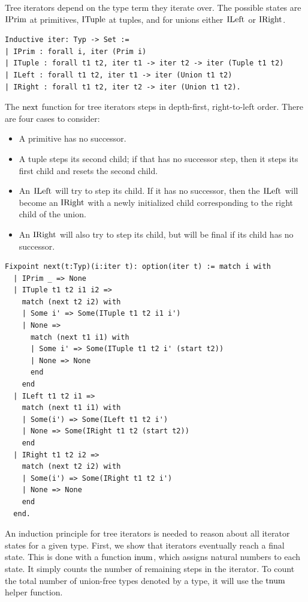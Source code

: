 \documentclass[a4paper,english]{lipics-v2019}
\renewcommand{\c}[1]{\ensuremath{\text{\lstinline{#1}}}\xspace}
\begin{document}
Tree iterators depend on the type term they iterate over. The possible
states are \c{IPrim} at primitives, \c{ITuple} at tuples, and for unions
either \c{ILeft} or \c{IRight}.

\begin{lstlisting}
Inductive iter: Typ -> Set :=
| IPrim : forall i, iter (Prim i)
| ITuple : forall t1 t2, iter t1 -> iter t2 -> iter (Tuple t1 t2)
| ILeft : forall t1 t2, iter t1 -> iter (Union t1 t2)
| IRight : forall t1 t2, iter t2 -> iter (Union t1 t2).
\end{lstlisting}

\noindent
The \c{next} function for tree iterators steps in depth-first,
right-to-left order. There are four cases to consider:
\begin{itemize}
  \item A primitive has no successor.
  \item A tuple steps its second child; if that
has no successor step, then it steps its first child and resets the second
child.
  \item An \c{ILeft} will try to step its child. If it has no successor, then the \c{ILeft} will become an \c{IRight} with a newly initialized child corresponding to the right child of the union.
  \item An \c{IRight} will also try to step its child, but will be final if its child has no successor.
  \end{itemize}

\begin{lstlisting}
Fixpoint next(t:Typ)(i:iter t): option(iter t) := match i with
  | IPrim _ => None
  | ITuple t1 t2 i1 i2 =>
    match (next t2 i2) with
    | Some i' => Some(ITuple t1 t2 i1 i')
    | None =>
      match (next t1 i1) with
      | Some i' => Some(ITuple t1 t2 i' (start t2))
      | None => None
      end
    end
  | ILeft t1 t2 i1 =>
    match (next t1 i1) with
    | Some(i') => Some(ILeft t1 t2 i')
    | None => Some(IRight t1 t2 (start t2))
    end
  | IRight t1 t2 i2 => 
    match (next t2 i2) with
    | Some(i') => Some(IRight t1 t2 i')
    | None => None
    end
  end.
\end{lstlisting}

\noindent
An induction principle for tree iterators is needed to reason about all
iterator states for a given type. First, we show that iterators eventually
reach a final state. This is done with a function \c{inum}, which assigns
natural numbers to each state. It simply counts the number of remaining
steps in the iterator. To count the total number of union-free types 
denoted by a type, it will use the \c{tnum} helper function.
\end{document}
